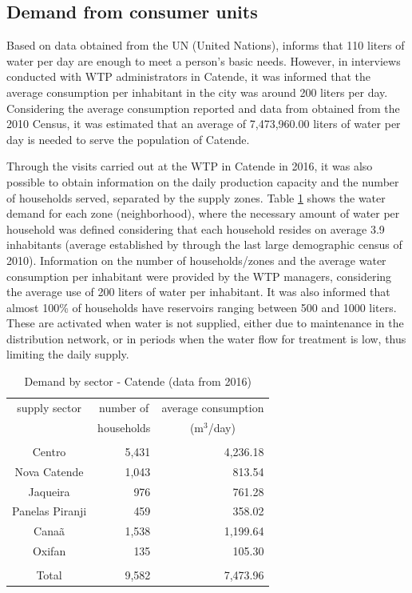 \documentclass{singlecol}
\theoremstyle{TH}{
\newtheorem{lemma}{Lemma}
\newtheorem{theorem}[lemma]{Theorem}
\newtheorem{corrolary}[lemma]{Corrolary}
\newtheorem{conjecture}[lemma]{Conjecture}
\newtheorem{proposition}[lemma]{Proposition}
\newtheorem{claim}[lemma]{Claim}
\newtheorem{stheorem}[lemma]{Wrong Theorem}
\newtheorem{algorithm}{Algorithm}
}
\theoremstyle{THrm}{
\newtheorem{definition}{Definition}[section]
\newtheorem{question}{Question}[section]
\newtheorem{remark}{Remark}
\newtheorem{scheme}{Scheme}
}
\theoremstyle{THhit}{
\newtheorem{case}{Case}[section]
}
\begin{document}
\subsection{Demand from consumer units}

Based on data obtained from the UN (United Nations), \cite{Paganine2013} informs that 110 liters of water per day are enough to meet a person's basic needs. However, in interviews conducted with WTP administrators in Catende, it was informed that the average consumption per inhabitant in the city was around 200 liters per day. Considering the average consumption reported and data from \cite{IBGECatende} obtained from the 2010 Census, it was estimated that an average of 7,473,960.00 liters of water per day is needed to serve the population of Catende. 

Through the visits carried out at the WTP in Catende in 2016, it was also possible to obtain information on the daily production capacity and the number of households served, separated by the supply zones. Table \ref{tab:SectorsCatende} shows the water demand for each zone (neighborhood), where the necessary amount of water per household was defined considering that each household resides on average 3.9 inhabitants (average established by \cite{IBGECatende} through the last large demographic census of 2010). Information on the number of households/zones and the average water consumption per inhabitant were provided by the WTP managers, considering the average use of 200 liters of water per inhabitant. It was also informed that almost 100\% of households have reservoirs ranging between 500 and 1000 liters. These are activated when water is not supplied, either due to maintenance in the distribution network, or in periods when the water flow for treatment is low, thus limiting the daily supply. 

\begin{table}[H]
\begin{center}
	\begin{tabular}{ c  r  r } 
		supply sector       &  \multicolumn{1}{c}{number of}     &   \multicolumn{1}{c}{average consumption}  \\
		                    &  \multicolumn{1}{c}{households}    &  \multicolumn{1}{c}{($\mathrm{m^3}$/day)}   \\
		\\
		Centro              & 5,431          &  4,236.18 \\
		Nova Catende        & 1,043 	   &    813.54  \\
		Jaqueira            &  976          &    761.28 \\
		Panelas Piranji     &  459          &   358.02 \\
		Canaã               & 1,538          &  1,199.64 \\
		Oxifan              &  135          &   105.30 \\
		\\
		Total               & 9,582          &  7,473.96 \\
		\hline
	\end{tabular}
\caption{Demand by sector - Catende (data from 2016)}
\label{tab:SectorsCatende}
\end{center}
\end{table}
\end{document}
